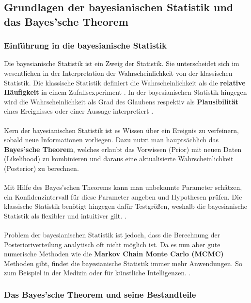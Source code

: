 \documentclass[a4paper,12pt]{article}
\begin{document}
\subsection{Grundlagen der bayesianischen Statistik und das Bayes'sche Theorem}
\subsubsection{Einführung in die bayesianische Statistik}

Die bayesianische Statistik ist ein Zweig der Statistik. Sie unterscheidet sich im wesentlichen in der Interpretation der Wahrscheinlichkeit von der klassischen Statistik. Die klassische Statistik definiert die Wahrscheinlichkeit als die \textbf{relative Häufigkeit} in einem Zufallsexperiment \parencite[2]{StatistikKlassischOderBayes}. In der bayesianischen Statistik hingegen wird die Wahrscheinlichkeit als Grad des Glaubens respektiv als \textbf{Plausibilität} eines Ereignisses oder einer Aussage interpretiert \parencite[1]{EinfBayesStatistik}. \\\\
Kern der bayesianischen Statistik ist es Wissen über ein Ereignis zu verfeinern, sobald neue Informationen vorliegen. Dazu nutzt man hauptsächlich das \textbf{Bayes'sche Theorem}, welches erlaubt das Vorwissen (Prior) mit neuen Daten (Likelihood) zu kombinieren und daraus eine aktualisierte Wahrscheinlichkeit (Posterior) zu berechnen. \\\\
Mit Hilfe des Bayes'schen Theorems kann man unbekannte Parameter schätzen, ein Konfidenzintervall für diese Parameter angeben und Hypothesen prüfen. Die klassische Statistik benötigt hingegen dafür Testgrößen, weshalb die bayesianische Statistik als flexibler und intuitiver gilt. \parencite[1]{EinfBayesStatistik}. \\\\
Problem der bayesianischen Statistik ist jedoch, dass die Berechnung der Posterioriverteilung analytisch oft nicht möglich ist. Da es nun aber gute numerische Methoden wie die \textbf{Markov Chain Monte Carlo (MCMC)} Methoden gibt, findet die bayesianische Statistik immer mehr Anwendungen. So zum Beispiel in der Medizin oder für künstliche Intelligenzen. \parencite[1]{StatistikKlassischOderBayes}.

\subsubsection{Das Bayes'sche Theorem und seine Bestandteile}
\end{document}
